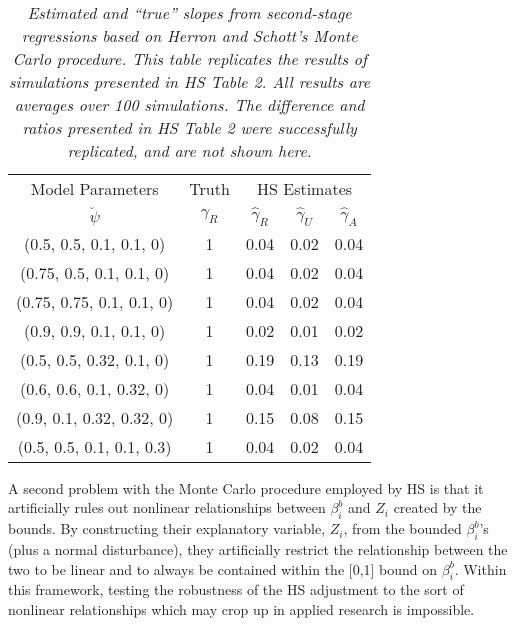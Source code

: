 \documentclass[11pt,titlepage]{article}
\begin{document}
\begin{table}[tb]
\label{t:hsrep}
\begin{center}
\begin{tabular}{cc|c c c}
Model Parameters & Truth & \multicolumn{3}{c}{HS Estimates} \\
$\breve\psi$  & $\gamma_R$ & $\hat\gamma_R$  &       $\hat\gamma_U$ & $\hat\gamma_A$ \\\hline
(0.5, 0.5, 0.1, 0.1, 0)&1 &       0.04    &       0.02    &       0.04        \\
(0.75, 0.5, 0.1, 0.1, 0) &1       &       0.04    &       0.02    &       0.04        \\
(0.75, 0.75, 0.1, 0.1, 0) &1      &       0.04    &       0.02    &       0.04     \\
(0.9, 0.9, 0.1, 0.1, 0) &1&       0.02    &       0.01    &       0.02          \\
(0.5, 0.5, 0.32, 0.1, 0) &1       &       0.19    &       0.13    &       0.19        \\
(0.6, 0.6, 0.1, 0.32, 0) &1       &       0.04    &       0.01    &       0.04     \\
(0.9, 0.1, 0.32, 0.32, 0)&1       &       0.15    &       0.08    &       0.15        \\
(0.5, 0.5, 0.1, 0.1, 0.3)&1       &       0.04    &       0.02    &       0.04     \\
\hline
\end{tabular}
\end{center}
\caption{\em Estimated and ``true'' slopes from 
second-stage regressions based on Herron and Schott's Monte Carlo 
procedure. This table replicates the results of simulations presented in
HS Table 2.  All results are averages over 100 simulations.  
The difference and ratios presented in HS Table 2 were  
successfully replicated, and are not shown here.}
\end{table}

A second problem with the Monte Carlo procedure employed by HS is that
it artificially rules out nonlinear relationships between $\beta_i^b$
and $Z_i$ created by the bounds.  By constructing their explanatory
variable, $Z_i$, from the bounded $\beta_i^b$'s (plus a normal
disturbance), they artificially restrict the relationship between the
two to be linear and to always be contained within the [0,1] bound on
$\beta_i^b$.  Within this framework, testing the robustness of the HS
adjustment to the sort of nonlinear relationships which may crop up in
applied research is impossible.
\end{document}
